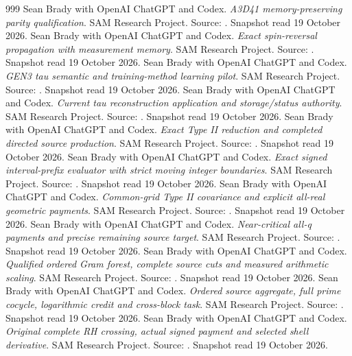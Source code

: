 \begin{thebibliography}{999}
 Sean Brady with OpenAI ChatGPT and Codex. \emph{A3D41 memory-preserving parity qualification}. SAM Research Project. Source: . Snapshot read 19 October 2026.
 Sean Brady with OpenAI ChatGPT and Codex. \emph{Exact spin-reversal propagation with measurement memory}. SAM Research Project. Source: . Snapshot read 19 October 2026.
 Sean Brady with OpenAI ChatGPT and Codex. \emph{GEN3 tau semantic and training-method learning pilot}. SAM Research Project. Source: . Snapshot read 19 October 2026.
 Sean Brady with OpenAI ChatGPT and Codex. \emph{Current tau reconstruction application and storage/status authority}. SAM Research Project. Source: . Snapshot read 19 October 2026.
 Sean Brady with OpenAI ChatGPT and Codex. \emph{Exact Type II reduction and completed directed source production}. SAM Research Project. Source: . Snapshot read 19 October 2026.
 Sean Brady with OpenAI ChatGPT and Codex. \emph{Exact signed interval-prefix evaluator with strict moving integer boundaries}. SAM Research Project. Source: . Snapshot read 19 October 2026.
 Sean Brady with OpenAI ChatGPT and Codex. \emph{Common-grid Type II covariance and explicit all-real geometric payments}. SAM Research Project. Source: . Snapshot read 19 October 2026.
 Sean Brady with OpenAI ChatGPT and Codex. \emph{Near-critical all-q payments and precise remaining source target}. SAM Research Project. Source: . Snapshot read 19 October 2026.
 Sean Brady with OpenAI ChatGPT and Codex. \emph{Qualified ordered Gram forest, complete source cuts and measured arithmetic scaling}. SAM Research Project. Source: . Snapshot read 19 October 2026.
 Sean Brady with OpenAI ChatGPT and Codex. \emph{Ordered source aggregate, full prime cocycle, logarithmic credit and cross-block task}. SAM Research Project. Source: . Snapshot read 19 October 2026.
 Sean Brady with OpenAI ChatGPT and Codex. \emph{Original complete RH crossing, actual signed payment and selected shell derivative}. SAM Research Project. Source: . Snapshot read 19 October 2026.

\end{thebibliography}
